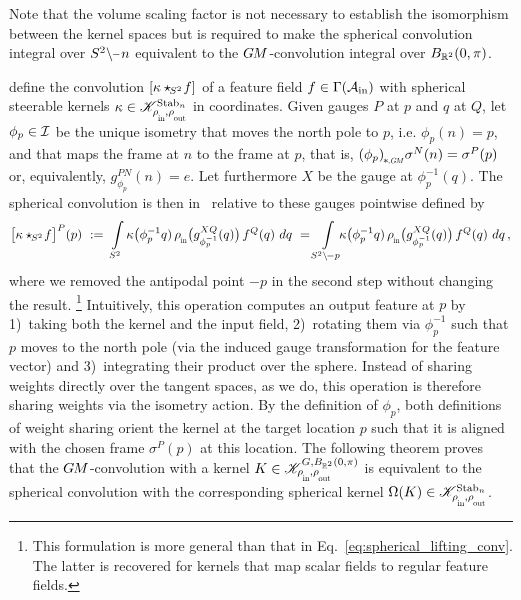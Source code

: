 Note that the volume scaling factor is not necessary to establish the isomorphism between the kernel spaces but is required to make the spherical convolution integral over $S^2\backslash \mkern-1mu\minus\mkern1mu n$ equivalent to the $G\mkern-1.4muM$-convolution integral over $B_{\mathbb{R}^2}(0,\pi)$.


\citet{Cohen2018-intertwiners} define the convolution ${[\kappa \star_{\mkern-2mu S^2}\! f]}$ of a feature field $f\in\Gamma(\mathcal{A}_\textup{in})$ with spherical steerable kernels $\kappa \in \mathscr{K}^{\Stab{n}}_{\rhoin\mkern-1mu,\rhoout}$ in coordinates.
Given gauges $P$ at $p$ and $q$ at $Q$, let $\phi_p \in \mathcal{I}$ be the unique isometry that moves the north pole to $p$, i.e. $\phi_p(n) = p$, and that maps the frame at $n$ to the frame at $p$, that is, $\dphipGM \sigma^N(n) = \sigma^P(p)$ or, equivalently, $g_{\phi_p}^{PN}(n) = e$.
Let furthermore $X$ be the gauge at $\phi_p^{-1}(q)$.
The spherical convolution is then in~\cite{Cohen2018-intertwiners} relative to these gauges pointwise defined by
\begin{align}\label{eq:spherical_steerable_conv}
    \big[\kappa \star_{\mkern-2mu S^2}\! f\big]^P(p)
    \ :=\ \int\limits_{S^2} \kappa\big(\phi_p^{-1}q)\, \rhoin\big( g_{\phi_p^{-1}}^{XQ}(q) \big)\, f^Q(q)\ dq
    \ = \int\limits_{S^2 \backslash \mkern-2mu -p} \mkern-8mu \kappa\big(\phi_p^{-1}q)\, \rhoin\big( g_{\phi_p^{-1}}^{XQ}(q) \big)\, f^Q(q)\ dq \,,
\end{align}
where we removed the antipodal point $-p$ in the second step without changing the result.%
\footnote{
    This formulation is more general than that in Eq.~\eqref{eq:spherical_lifting_conv}.
    The latter is recovered for kernels that map scalar fields to regular feature fields.
}
Intuitively, this operation computes an output feature at $p$ by
1)~taking both the kernel and the input field,
2)~rotating them via $\phi_p^{-1}$ such that $p$ moves to the north pole (via the induced gauge transformation for the feature vector) and
3)~integrating their product over the sphere.
Instead of sharing weights directly over the tangent spaces, as we do, this operation is therefore sharing weights via the isometry action.
By the definition of $\phi_p$, both definitions of weight sharing orient the kernel at the target location $p$ such that it is aligned with the chosen frame $\sigma^P(p)$ at this location.
The following theorem proves that the $G\mkern-1.4muM$-convolution with a kernel $K \in \mathscr{K}^{G,B_{\R^2}(0,\pi)}_{\rhoin\mkern-1mu,\rhoout}$ is equivalent to the spherical convolution with the corresponding spherical kernel $\Omega(K) \in \mathscr{K}^{\Stab{n}}_{\rhoin\mkern-1mu,\rhoout}$.
